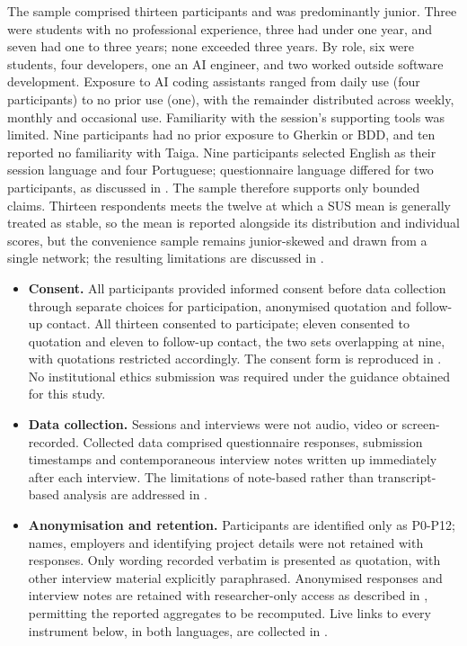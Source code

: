 The sample comprised thirteen participants and was predominantly junior. Three were students with no professional experience, three had under one year, and seven had one to three years; none exceeded three years. By role, six were students, four developers, one an \ac{AI} engineer, and two worked outside software development. Exposure to AI coding assistants ranged from daily use (four participants) to no prior use (one), with the remainder distributed across weekly, monthly and occasional use. Familiarity with the session's supporting tools was limited. Nine participants had no prior exposure to Gherkin or \ac{BDD}, and ten reported no familiarity with Taiga. Nine participants selected English as their session language and four Portuguese; questionnaire language differed for two participants, as discussed in . The sample therefore supports only bounded claims. Thirteen respondents meets the twelve at which a \ac{SUS} mean is generally treated as stable, so the mean is reported alongside its distribution and individual scores, but the convenience sample remains junior-skewed and drawn from a single network; the resulting limitations are discussed in .

\begin{itemize}[leftmargin=0.6cm, itemsep=0.3em, topsep=0.2em]

\item \textbf{Consent.} All participants provided informed consent before data collection through separate choices for participation, anonymised quotation and follow-up contact. All thirteen consented to participate; eleven consented to quotation and eleven to follow-up contact, the two sets overlapping at nine, with quotations restricted accordingly. The consent form is reproduced in . No institutional ethics submission was required under the guidance obtained for this study.

\item \textbf{Data collection.} Sessions and interviews were not audio, video or screen-recorded. Collected data comprised questionnaire responses, submission timestamps and contemporaneous interview notes written up immediately after each interview. The limitations of note-based rather than transcript-based analysis are addressed in .

\item \textbf{Anonymisation and retention.} Participants are identified only as P0-P12; names, employers and identifying project details were not retained with responses. Only wording recorded verbatim is presented as quotation, with other interview material explicitly paraphrased. Anonymised responses and interview notes are retained with researcher-only access as described in , permitting the reported aggregates to be recomputed. Live links to every instrument below, in both languages, are collected in .

\end{itemize}

